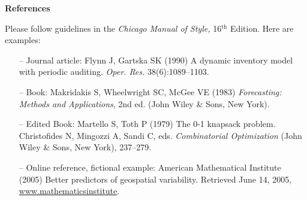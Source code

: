 \documentclass[11pt]{article}
\begin{document}
\textbf{References}

\bgroup
\parskip0pt

Please follow guidelines in the \textit{Chicago Manual of Style,} 16$^{\text{th}}$ Edition. Here are examples: 

\begin{itemize}
\item[--] Journal article: Flynn J, Gartska SK (1990) A dynamic inventory model with periodic auditing. \textit{Oper. Res.} 38(6):1089--1103. 
\item[--] Book: Makridakis S, Wheelwright SC, McGee VE (1983) \textit{Forecasting: Methods and Applications}, 2nd ed. (John Wiley {\&} Sons, New York). 
\item[--] Edited Book: Martello S, Toth P (1979) The 0-1 knapsack problem. Christofides N, Mingozzi A, Sandi C, eds. \textit{Combinatorial Optimization} (John Wiley {\&} Sons, New York), 237--279.
\item[--] Online reference, fictional example: American Mathematical Institute (2005) Better predictors of geospatial variability. Retrieved June 14, 2005, \underline {www.mathematicsinstitute}.

\end{itemize}

\egroup
\end{document}
